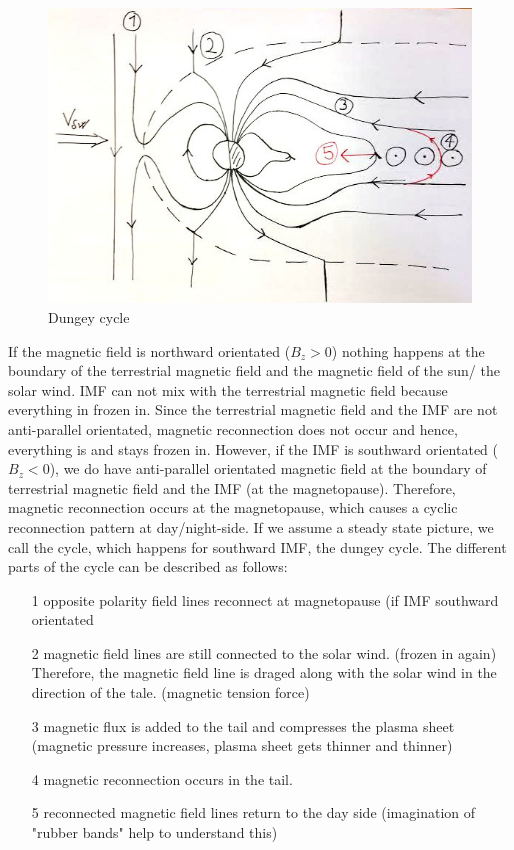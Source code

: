 \documentclass[10pt,a4paper]{article}
\begin{document}
\begin{figure}[h]
\centering
\caption{Dungey cycle}
\label{aurora substorm}
\includegraphics[scale=0.5]{solvind.jpg}
\end{figure}

If the magnetic field is northward orientated ($B_z>0$) nothing happens at the boundary of the terrestrial magnetic field and the magnetic field of the sun/ the solar wind. IMF can not mix with the terrestrial magnetic field because everything in frozen in. Since the terrestrial magnetic field and the IMF are not anti-parallel orientated, magnetic reconnection does not occur and hence, everything is and stays frozen in. 
However, if the IMF is southward orientated ($B_z<0$), we do have anti-parallel orientated magnetic field at the boundary of terrestrial magnetic field and the IMF (at the magnetopause). Therefore, magnetic reconnection occurs at the magnetopause, which causes a cyclic reconnection pattern at day/night-side. If we assume a steady state picture, we call the cycle, which happens for southward IMF, the dungey cycle. The different parts of the cycle can be described as follows:
\begin{itemize}
\item[1] opposite polarity field lines reconnect at magnetopause (if IMF southward orientated
\item[2] magnetic field lines are still connected to the solar wind. (frozen in again) Therefore, the magnetic field line is draged along with the solar wind in the direction of the tale. (magnetic tension force)
\item[3] magnetic flux is added to the tail and compresses the plasma sheet (magnetic pressure increases, plasma sheet gets thinner and thinner)
\item[4] magnetic reconnection occurs in the tail. 
\item[5] reconnected magnetic field lines return to the day side (imagination of "rubber bands" help to understand this)
\end{itemize}
\end{document}
